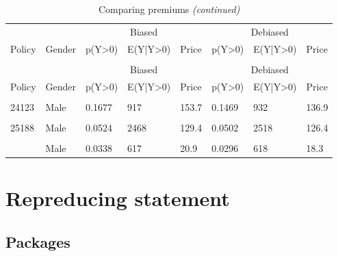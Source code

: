 \documentclass[
]{article}
\begin{document}
\begin{longtable}[t]{llllllll}
\caption{\label{tab:unnamed-chunk-11}Comparing premiums}\\
\toprule
\multicolumn{2}{c}{ } & \multicolumn{3}{c}{Biased} & \multicolumn{3}{c}{Debiased} \\
\cmidrule(l{3pt}r{3pt}){3-5} \cmidrule(l{3pt}r{3pt}){6-8}
Policy & Gender & p(Y>0) & E(Y|Y>0) & Price & p(Y>0) & E(Y|Y>0) & Price\\
\midrule
\endfirsthead
\caption[]{Comparing premiums \textit{(continued)}}\\
\toprule
\multicolumn{2}{c}{ } & \multicolumn{3}{c}{Biased} & \multicolumn{3}{c}{Debiased} \\
\cmidrule(l{3pt}r{3pt}){3-5} \cmidrule(l{3pt}r{3pt}){6-8}
Policy & Gender & p(Y>0) & E(Y|Y>0) & Price & p(Y>0) & E(Y|Y>0) & Price\\
\midrule
\endhead

\endfoot
\bottomrule
\endlastfoot
\cellcolor{gray!6}{6254} & \cellcolor{gray!6}{Female} & \cellcolor{gray!6}{0.0465} & \cellcolor{gray!6}{1051} & \cellcolor{gray!6}{48.9} & \cellcolor{gray!6}{0.0550} & \cellcolor{gray!6}{1007} & \cellcolor{gray!6}{55.4}\\
24123 & Male & 0.1677 & 917 & 153.7 & 0.1469 & 932 & 136.9\\
\cellcolor{gray!6}{25010} & \cellcolor{gray!6}{Female} & \cellcolor{gray!6}{0.1097} & \cellcolor{gray!6}{1226} & \cellcolor{gray!6}{134.4} & \cellcolor{gray!6}{0.1074} & \cellcolor{gray!6}{1189} & \cellcolor{gray!6}{127.7}\\
25188 & Male & 0.0524 & 2468 & 129.4 & 0.0502 & 2518 & 126.4\\
\cellcolor{gray!6}{30495} & \cellcolor{gray!6}{Female} & \cellcolor{gray!6}{0.1034} & \cellcolor{gray!6}{755} & \cellcolor{gray!6}{78.1} & \cellcolor{gray!6}{0.0976} & \cellcolor{gray!6}{804} & \cellcolor{gray!6}{78.4}\\
\addlinespace
30555 & Male & 0.0338 & 617 & 20.9 & 0.0296 & 618 & 18.3\\*
\end{longtable}

\newpage

\hypertarget{repreducing-statement}{%
\section{Repreducing statement}\label{repreducing-statement}}

\hypertarget{packages}{%
\subsection{Packages}\label{packages}}
\end{document}
